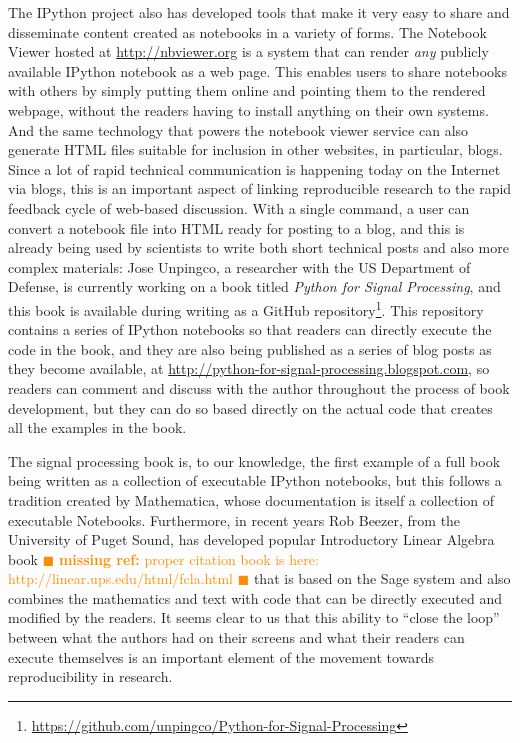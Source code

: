 \documentclass[ChapterTOCs,krantz2]{krantz} %
\theoremstyle{definition}
\newcommand{\mref}[1] { \textcolor{darkorange} {
\ensuremath{\blacksquare} {\bf missing ref:}  {#1}
\ensuremath{\blacksquare} } }
\begin{document}
The IPython project also has developed tools that make it very easy to share
and disseminate content created as notebooks in a variety of forms.  The
Notebook Viewer hosted at \url{http://nbviewer.org} is a system that can render
\emph{any} publicly available IPython notebook as a web page.  This enables
users to share notebooks with others by simply putting them online and
pointing them to the rendered webpage, without the readers having to install
anything on their own systems.  And the same technology that powers the
notebook viewer service can also generate HTML files suitable for inclusion in
other websites, in particular, blogs.  Since a lot of rapid technical
communication is happening today on the Internet via blogs, this is an
important aspect of linking reproducible research to the rapid feedback cycle
of web-based discussion.  With a single command, a user can convert a notebook
file into HTML ready for posting to a blog, and this is already being used by
scientists to write both short technical posts and also more complex
materials: Jose Unpingco, a researcher with the US Department of Defense, is
currently working on a book titled \emph{Python for Signal Processing}, and
this book is available during writing as a GitHub
repository\footnote{\url{https://github.com/unpingco/Python-for-Signal-Processing}}.
This repository contains a series of IPython notebooks so that readers can
directly execute the code in the book, and they are also being published as a
series of blog posts as they become available, at
\url{http://python-for-signal-processing.blogspot.com}, so readers can comment
and discuss with the author throughout the process of book development, but
they can do so based directly on the actual code that creates all the examples
in the book.

The signal processing book is, to our knowledge, the first example of a full
book being written as a collection of executable IPython notebooks, but this
follows a tradition created by Mathematica, whose documentation is itself a
collection of executable Notebooks.  Furthermore, in recent years Rob Beezer,
from the University of Puget Sound, has developed popular Introductory Linear
Algebra book \mref{proper citation book is here:
  http://linear.ups.edu/html/fcla.html} that is based on the Sage system and
also combines the mathematics and text with code that can be directly executed
and modified by the readers.  It seems clear to us that this ability to ``close
the loop'' between what the authors had on their screens and what their readers
can execute themselves is an important element of the movement towards
reproducibility in research.
\end{document}
